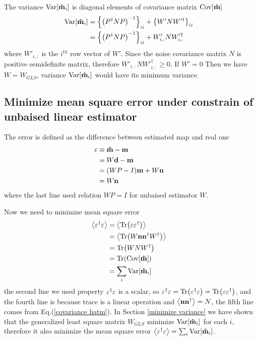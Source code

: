 \documentclass[11pt, letterpaper]{article}
\newcommand{\Var}[1]{\text{Var}\qty[#1]}
\newcommand{\Cov}[1]{\text{Cov}\qty[#1]}
\newcommand{\vbd}{\vb{d}}
\newcommand{\vbm}{\vb{m}}
\newcommand{\vbep}{\vb{\varepsilon}}
\newcommand{\vbn}{\vb{n}}
\newcommand{\inv}[1]{#1^{-1}}
\newcommand{\hatm}{\vb{\hat{m}}}
\newcommand{\Pdagger}{P^{\dagger}}
\newcommand{\PPinv}[1]{\inv{\qty(\Pdagger #1 P)}}
\begin{document}
The variance $\Var{\hatm_i}$ is diagonal elements of covariance matrix
$\Cov{\hatm}$
\begin{align}
\begin{aligned}[b]
\Var{\hatm_i}
&= \qty\Big{ \PPinv{N}}_{ii} + \qty\big{W' N W'^{\dagger}}_{ii}
\\
&= \qty\Big{ \PPinv{N}}_{ii} + W'_{i,:} N W'^{\dagger}_{i,:}
\end{aligned}
\end{align}
where $W'_{i,:}$ is the $i^{th}$ row vector of $W'$.
Since the noise covariance matrix $N$ is positive semidefinite matrix,
therefore $W'_{i,:} N W'^{\dagger}_{i,:} \geq 0$.
If $W' = 0$ Then we have $W = W_{GLS}$, variance $\Var{\hatm_i}$ would have 
its minimum variance. 

\subsection{Minimize mean square error under constrain of unbaised linear 
estimator}
The error is defined as the difference between estimated map and real one
\begin{align}
\begin{aligned}[b]
\vbep &\equiv \hatm - \vbm
\\
&= W\vbd - \vbm
\\
&= (WP-I)\vbm + W\vbn
\\
&= W\vbn
\end{aligned}
\end{align}
where the last line used relation $WP=I$ for unbaised estimator $W$. 

Now we need to minimize mean square error
\begin{align}
\begin{aligned}[b]
\ev{\vbep^{\dagger} \vbep }
&= \ev{\Tr(\vbep \vbep^{\dagger})}
\\
&=\ev{\Tr(W\vbn \vbn^{\dagger} W^{\dagger}) }
\\
&= \Tr(W N W^{\dagger})
\\
&= \Tr(\Cov{\hatm})\\
&= \sum_i \Var{\hatm_i}
\end{aligned}
\end{align}
the second line we used property $\vbep^{\dagger} \vbep$ is a scalar,
so $\vbep^{\dagger} \vbep = \Tr(\vbep^{\dagger} \vbep) 
= \Tr(\vbep \vbep^{\dagger})$,
and the fourth line is because trace is a linear operation 
and $\ev{\vbn \vbn^{\dagger} } = N$, 
the fifth line comes from Eq.(\ref{covariance hatm}).
In Section \ref{minimize variance} we have shown that the generalized least 
square matrix $W_{GLS}$ minimize $\Var{\hatm_i}$ for each $i$, 
therefore it also minimize the mean square error
$\ev{\vbep^{\dagger} \vbep} = \sum_i \Var{\hatm_i}$. 
\end{document}
